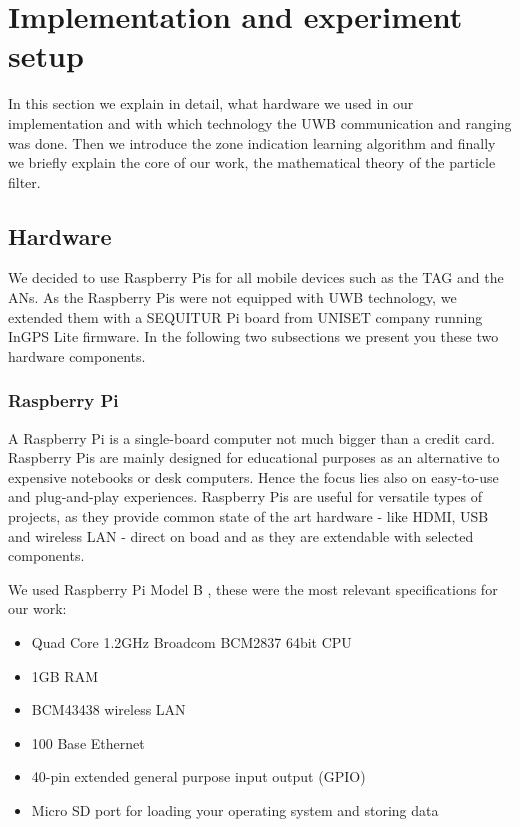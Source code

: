 
\chapter{Implementation and experiment setup} %

\label{Chapter4} %
In this section we explain in detail, what hardware we used in our implementation and with which technology the UWB communication and ranging was done. Then we introduce the zone indication learning algorithm and finally we briefly explain the core of our work, the mathematical theory of the particle filter.


\section{Hardware}
We decided to use Raspberry Pis for all mobile devices such as the TAG and the ANs. As the Raspberry Pis were not equipped with UWB technology, we extended them with a SEQUITUR Pi board from UNISET company running InGPS Lite firmware. In the following two subsections we present you these two hardware components.


\subsection{Raspberry Pi}
A Raspberry Pi is a single-board computer not much bigger than a credit card. Raspberry Pis are mainly designed for educational purposes as an alternative to expensive notebooks or desk computers. Hence the focus lies also on easy-to-use and plug-and-play experiences. Raspberry Pis are useful for versatile types of projects, as they provide common state of the art hardware - like HDMI, USB and wireless LAN - direct on boad and as they are extendable with selected components.

We used Raspberry Pi Model B \cite{Raspberry}, these were the most relevant specifications for our work:
\begin{itemize}
\item Quad Core 1.2GHz Broadcom BCM2837 64bit CPU
\item 1GB RAM
\item BCM43438 wireless LAN
\item 100 Base Ethernet
\item 40-pin extended general purpose input output (GPIO)
\item Micro SD port for loading your operating system and storing data
\end{itemize}

